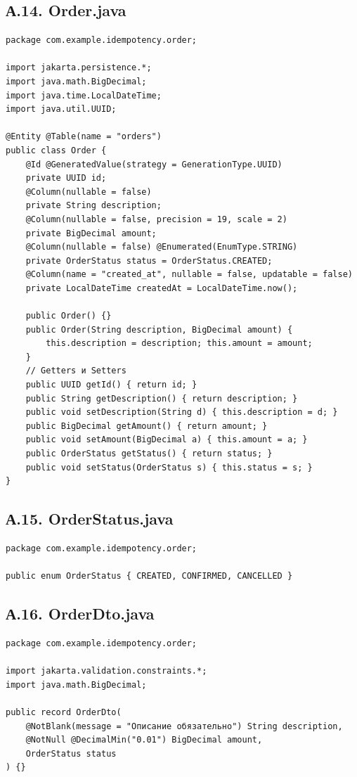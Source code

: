 \subsection*{А.14. Order.java}
\begin{lstlisting}[caption={Order.java --- сущность заказа}]
package com.example.idempotency.order;

import jakarta.persistence.*;
import java.math.BigDecimal;
import java.time.LocalDateTime;
import java.util.UUID;

@Entity @Table(name = "orders")
public class Order {
    @Id @GeneratedValue(strategy = GenerationType.UUID)
    private UUID id;
    @Column(nullable = false)
    private String description;
    @Column(nullable = false, precision = 19, scale = 2)
    private BigDecimal amount;
    @Column(nullable = false) @Enumerated(EnumType.STRING)
    private OrderStatus status = OrderStatus.CREATED;
    @Column(name = "created_at", nullable = false, updatable = false)
    private LocalDateTime createdAt = LocalDateTime.now();

    public Order() {}
    public Order(String description, BigDecimal amount) {
        this.description = description; this.amount = amount;
    }
    // Getters и Setters
    public UUID getId() { return id; }
    public String getDescription() { return description; }
    public void setDescription(String d) { this.description = d; }
    public BigDecimal getAmount() { return amount; }
    public void setAmount(BigDecimal a) { this.amount = a; }
    public OrderStatus getStatus() { return status; }
    public void setStatus(OrderStatus s) { this.status = s; }
}
\end{lstlisting}

\subsection*{А.15. OrderStatus.java}
\begin{lstlisting}[caption={OrderStatus.java}]
package com.example.idempotency.order;

public enum OrderStatus { CREATED, CONFIRMED, CANCELLED }
\end{lstlisting}

\subsection*{А.16. OrderDto.java}
\begin{lstlisting}[caption={OrderDto.java --- DTO заказа с валидацией}]
package com.example.idempotency.order;

import jakarta.validation.constraints.*;
import java.math.BigDecimal;

public record OrderDto(
    @NotBlank(message = "Описание обязательно") String description,
    @NotNull @DecimalMin("0.01") BigDecimal amount,
    OrderStatus status
) {}
\end{lstlisting}

